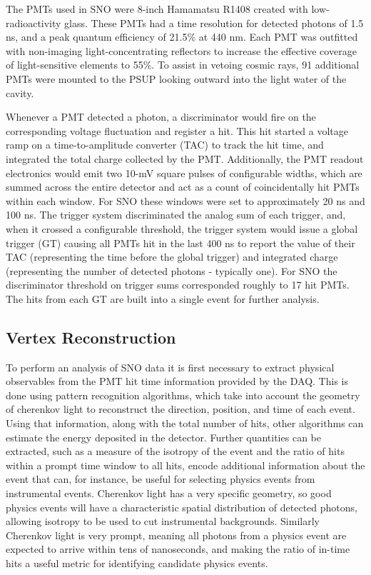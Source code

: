 The PMTs used in SNO were 8-inch Hamamatsu R1408 created with low-radioactivity glass. 
These PMTs had a time resolution for detected photons of 1.5 ns, and a peak quantum efficiency of 21.5\% at 440 nm.
Each PMT was outfitted with non-imaging light-concentrating reflectors to increase the effective coverage of light-sensitive elements to 55\%.
To assist in vetoing cosmic rays, 91 additional PMTs were mounted to the PSUP looking outward into the light water of the cavity. 

Whenever a PMT detected a photon, a discriminator would fire on the corresponding voltage fluctuation and register a hit.
This hit started a voltage ramp on a time-to-amplitude converter (TAC) to track the hit time, and integrated the total charge collected by the PMT.
Additionally, the PMT readout electronics would emit two  10-mV square pulses of configurable widths, which are summed across the entire detector and act as a count of coincidentally hit PMTs within each window.
For SNO these windows were set to approximately 20 ns and 100 ns.
The trigger system discriminated the analog sum of each trigger, and, when it crossed a configurable threshold, the trigger system would issue a global trigger (GT) causing all PMTs hit in the last 400 ns to report the value of their TAC (representing the time before the global trigger) and integrated charge (representing the number of detected photons - typically one).
For SNO the discriminator threshold on trigger sums corresponded roughly to 17 hit PMTs.
The hits from each GT are built into a single event for further analysis.

\subsection{Vertex Reconstruction}

To perform an analysis of SNO data it is first necessary to extract physical observables from the PMT hit time information provided by the DAQ.
This is done using pattern recognition algorithms, which take into account the geometry of cherenkov light to reconstruct the direction, position, and time of each event.
Using that information, along with the total number of hits, other algorithms can estimate the energy deposited in the detector. 
Further quantities can be extracted, such as a measure of the isotropy of the event and the ratio of hits within a prompt time window to all hits, encode additional information about the event that can, for instance, be useful for selecting physics events from instrumental events.
Cherenkov light has a very specific geometry, so good physics events will have a characteristic spatial distribution of detected photons, allowing isotropy to be used to cut instrumental backgrounds.
Similarly Cherenkov light is very prompt, meaning all photons from a physics event are expected to arrive within tens of nanoseconds, and making the ratio of in-time hits a useful metric for identifying candidate physics events. 

